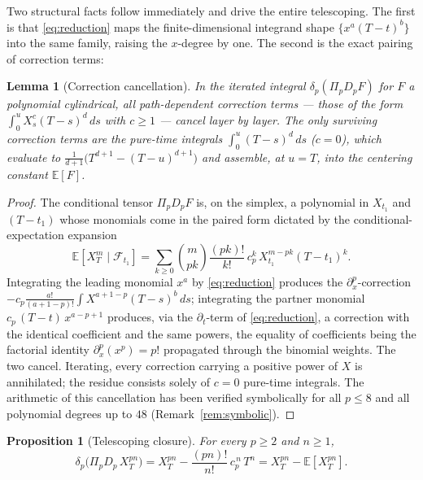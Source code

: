 \documentclass[11pt,reqno]{amsart}
\theoremstyle{plain}
\newtheorem{proposition}[theorem]{Proposition}
\newtheorem{lemma}[theorem]{Lemma}
\theoremstyle{definition}
\newcommand{\E}{\mathbb{E}}
\begin{document}
Two structural facts follow immediately and drive the entire telescoping. The first is that \eqref{eq:reduction} maps the finite-dimensional integrand shape $\{x^a (T-t)^b\}$ into the same family, raising the $x$-degree by one. The second is the exact pairing of correction terms:

\begin{lemma}[Correction cancellation]
\label{lem:cancellation}
In the iterated integral $\delta_p(\Pi_p D_p F)$ for $F$ a polynomial cylindrical, all path-dependent correction terms --- those of the form $\int_0^u X_s^{c}(T-s)^{d}\, ds$ with $c \geq 1$ --- cancel layer by layer. The only surviving correction terms are the pure-time integrals $\int_0^u (T-s)^{d}\, ds$ ($c=0$), which evaluate to $\tfrac{1}{d+1}\bigl(T^{d+1}-(T-u)^{d+1}\bigr)$ and assemble, at $u=T$, into the centering constant $\E[F]$.
\end{lemma}

\begin{proof}
The conditional tensor $\Pi_p D_p F$ is, on the simplex, a polynomial in $X_{t_1}$ and $(T-t_1)$ whose monomials come in the paired form dictated by the conditional-expectation expansion
\[
\E[X_T^m \mid \mathcal F_{t_1}] = \sum_{k\geq 0}\binom{m}{pk}\frac{(pk)!}{k!}\,c_p^k\,X_{t_1}^{m-pk}(T-t_1)^k .
\]
Integrating the leading monomial $x^{a}$ by \eqref{eq:reduction} produces the $\partial_x^p$-correction $-c_p\tfrac{a!}{(a+1-p)!}\int X^{a+1-p}(T-s)^b\,ds$; integrating the partner monomial $c_p\,(T-t)\,x^{a-p+1}$ produces, via the $\partial_t$-term of \eqref{eq:reduction}, a correction with the identical coefficient and the same powers, the equality of coefficients being the factorial identity $\partial_x^p(x^p)=p!$ propagated through the binomial weights. The two cancel. Iterating, every correction carrying a positive power of $X$ is annihilated; the residue consists solely of $c=0$ pure-time integrals. The arithmetic of this cancellation has been verified symbolically for all $p \leq 8$ and all polynomial degrees up to $48$ (Remark~\ref{rem:symbolic}).
\end{proof}

\begin{proposition}[Telescoping closure]
\label{prop:telescope}
For every $p \geq 2$ and $n \geq 1$,
\begin{equation}
\delta_p\bigl(\Pi_p D_p\, X_T^{pn}\bigr) = X_T^{pn} - \frac{(pn)!}{n!}\,c_p^{\,n}\,T^{n} = X_T^{pn} - \E[X_T^{pn}].
\end{equation}
\end{proposition}
\end{document}

